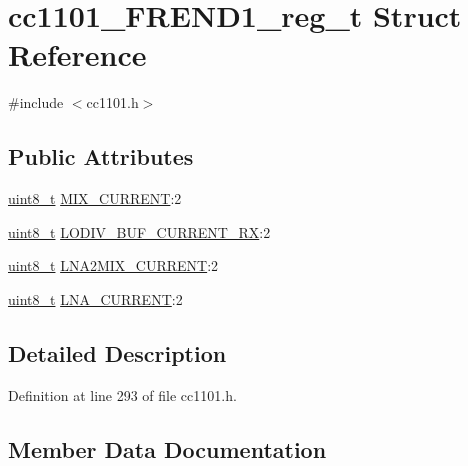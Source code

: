 \hypertarget{structcc1101___f_r_e_n_d1__reg__t}{}\section{cc1101\+\_\+\+F\+R\+E\+N\+D1\+\_\+reg\+\_\+t Struct Reference}
\label{structcc1101___f_r_e_n_d1__reg__t}


{\ttfamily \#include $<$cc1101.\+h$>$}

\subsection*{Public Attributes}
\begin{DoxyCompactItemize}
\item 
\hyperlink{_p_e___types_8h_aba7bc1797add20fe3efdf37ced1182c5}{uint8\+\_\+t} \hyperlink{structcc1101___f_r_e_n_d1__reg__t_a0694bfcb86046b21285840f5adb10c8d}{M\+I\+X\+\_\+\+C\+U\+R\+R\+E\+NT}\+:2
\item 
\hyperlink{_p_e___types_8h_aba7bc1797add20fe3efdf37ced1182c5}{uint8\+\_\+t} \hyperlink{structcc1101___f_r_e_n_d1__reg__t_a124b91288b0a8cb9e76ed6634061fde9}{L\+O\+D\+I\+V\+\_\+\+B\+U\+F\+\_\+\+C\+U\+R\+R\+E\+N\+T\+\_\+\+RX}\+:2
\item 
\hyperlink{_p_e___types_8h_aba7bc1797add20fe3efdf37ced1182c5}{uint8\+\_\+t} \hyperlink{structcc1101___f_r_e_n_d1__reg__t_ab74c64c42046e6ef22af36cb08d5d98f}{L\+N\+A2\+M\+I\+X\+\_\+\+C\+U\+R\+R\+E\+NT}\+:2
\item 
\hyperlink{_p_e___types_8h_aba7bc1797add20fe3efdf37ced1182c5}{uint8\+\_\+t} \hyperlink{structcc1101___f_r_e_n_d1__reg__t_a55069e0c05af5c05a1de0e0789bb37cd}{L\+N\+A\+\_\+\+C\+U\+R\+R\+E\+NT}\+:2
\end{DoxyCompactItemize}


\subsection{Detailed Description}


Definition at line 293 of file cc1101.\+h.



\subsection{Member Data Documentation}
